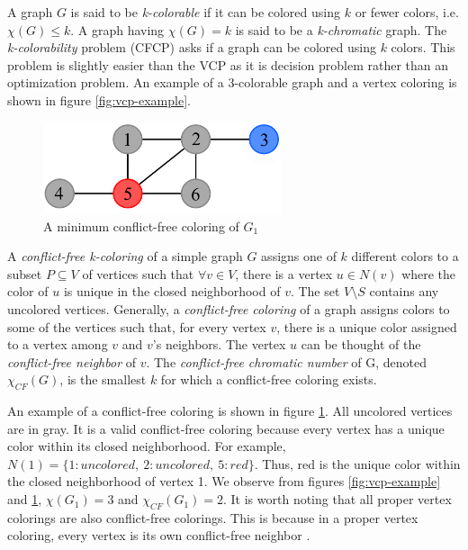 \documentclass{sig-alternate}
\begin{document}
A graph $G$ is said to be \emph{k-colorable} if it can be colored using $k$ or fewer colors, i.e. $\chi(G) \leq k$. A graph having $\chi(G) = k$ is said to be a \emph{k-chromatic} graph. The \emph{k-colorability} problem (CFCP) asks if a graph can be colored using $k$ colors. This problem is slightly easier than the VCP as it is decision problem rather than an optimization problem. An example of a 3-colorable graph and a vertex coloring is shown in figure \ref{fig:vcp-example}.

\begin{figure}[h]
	\centering
	\includegraphics[width=7cm]{../figures/example-cfcp.pdf}
	\caption{A minimum conflict-free coloring of $G_1$}\label{fig:cfcp-example}
\end{figure}

A \emph{conflict-free k-coloring} of a simple graph $G$ assigns one of $k$ different colors to a subset $P \subseteq V$ of vertices such that $\forall v \in V$, there is a vertex $u \in N(v)$ where the color of $u$ is unique in the closed neighborhood of $v$. The set $V \setminus S$ contains any uncolored vertices. Generally, a \emph{conflict-free coloring} of a graph assigns colors to some of the vertices such that, for every vertex $v$, there is a unique color assigned to a vertex among $v$ and $v$'s neighbors. The vertex $u$ can be thought of the \emph{conflict-free neighbor} of $v$. The \emph{conflict-free chromatic number} of G, denoted $\chi_{CF}(G)$, is the smallest $k$ for which a conflict-free coloring exists. \cite{abel2017three}

An example of a conflict-free coloring is shown in figure \ref{fig:cfcp-example}. All uncolored vertices are in gray. It is a valid conflict-free coloring because every vertex has a unique color within its closed neighborhood. For example, $N(1) = \{1: uncolored,\ 2: uncolored,\ 5: red\}$. Thus, red is the unique color within the closed neighborhood of vertex 1. We observe from figures \ref{fig:vcp-example} and \ref{fig:cfcp-example}, $\chi(G_1) = 3$ and $\chi_{CF}(G_1) = 2$. It is worth noting that all proper vertex colorings are also conflict-free colorings. This is because in a proper vertex coloring, every vertex is its own conflict-free neighbor \cite{abel2017three}.
\end{document}
